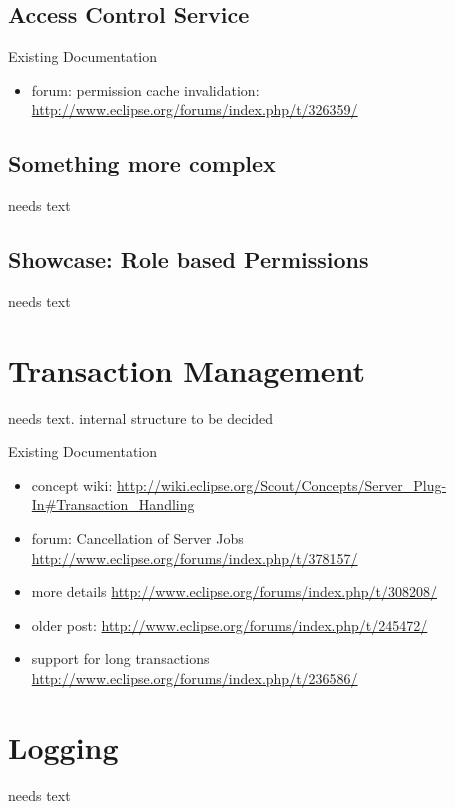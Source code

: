 \documentclass[a4paper,10pt,twoside]{book}
\begin{document}
\section{Access Control Service}

\noindent Existing Documentation
\begin{itemize}
  \item forum: permission cache invalidation: \url{http://www.eclipse.org/forums/index.php/t/326359/}
\end{itemize}

\section{Something more complex}
needs text

\section{Showcase: Role based Permissions}
needs text

\chapter{Transaction Management}

needs text. internal structure to be decided

\noindent Existing Documentation
\begin{itemize}
  \item concept wiki: \url{http://wiki.eclipse.org/Scout/Concepts/Server_Plug-In#Transaction_Handling}
  \item forum: Cancellation of Server Jobs \url{http://www.eclipse.org/forums/index.php/t/378157/}
  \item more details \url{http://www.eclipse.org/forums/index.php/t/308208/}
  \item older post: \url{http://www.eclipse.org/forums/index.php/t/245472/}
  \item support for long transactions \url{http://www.eclipse.org/forums/index.php/t/236586/}  
\end{itemize}

\chapter{Logging}
needs text
\end{document}
